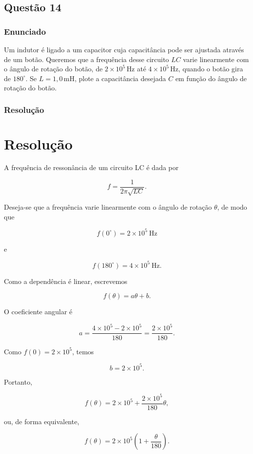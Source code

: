 \subsection{Questão 14}

\subsubsection{Enunciado}

Um indutor é ligado a um capacitor cuja capacitância pode ser ajustada através de um botão. Queremos que a frequência desse circuito \(LC\) varie linearmente com o ângulo de rotação do botão, de \(2 \times 10^{5}\,\text{Hz}\) até \(4 \times 10^{5}\,\text{Hz}\), quando o botão gira de \(180^\circ\). Se \(L = 1{,}0\,\text{mH}\), plote a capacitância desejada \(C\) em função do ângulo de rotação do botão.


\subsubsection{Resolução}
\section*{Resolução}

A frequência de ressonância de um circuito LC é dada por

\[
f=\frac{1}{2\pi\sqrt{LC}}.
\]

Deseja-se que a frequência varie linearmente com o ângulo de rotação \(\theta\), de modo que

\[
f(0^\circ)=2\times10^5\ \text{Hz}
\]

e

\[
f(180^\circ)=4\times10^5\ \text{Hz}.
\]

Como a dependência é linear, escrevemos

\[
f(\theta)=a\theta+b.
\]

O coeficiente angular é

\[
a=\frac{4\times10^5-2\times10^5}{180}
=\frac{2\times10^5}{180}.
\]

Como \(f(0)=2\times10^5\), temos

\[
b=2\times10^5.
\]

Portanto,

\[
f(\theta)=2\times10^5+\frac{2\times10^5}{180}\theta,
\]

ou, de forma equivalente,

\[
f(\theta)=2\times10^5\left(1+\frac{\theta}{180}\right).
\]

